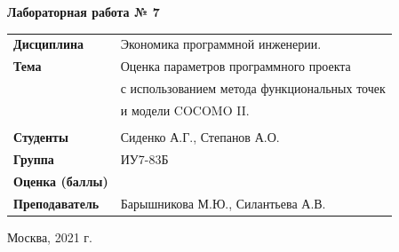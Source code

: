 \documentclass[a4paper,14pt]{extreport} %
\begin{document}
\begin{titlepage}
    \vspace{2cm}

    \begin{center}
        \textbf{Лабораторная работа № 7} \\
        \vspace{0.5cm}
    \end{center}

    \vspace{4cm}

    \begin{flushleft}
        \begin{tabular}{ll}
            \textbf{Дисциплина} & Экономика программной инженерии.  \\
            \textbf{Тема} & Оценка параметров программного проекта \\
            & с использованием метода функциональных точек \\
            & и модели COCOMO II. \\
            \\
            \textbf{Студенты} & Сиденко А.Г., Степанов А.О. \\
            \textbf{Группа} & ИУ7-83Б \\
            \textbf{Оценка (баллы)} & \\
            \textbf{Преподаватель} & Барышникова М.Ю., Силантьева А.В.   \\
        \end{tabular}
    \end{flushleft}

    \vspace{4cm}

   \begin{center}
        Москва, 2021 г.
    \end{center}

\end{titlepage}
\end{document}
